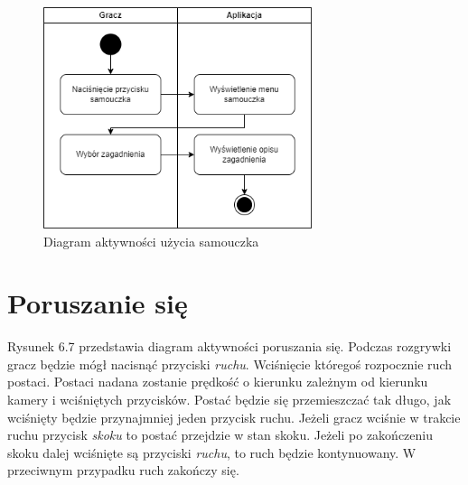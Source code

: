 \begin{figure}[H]
    \centering
        \includegraphics[width=0.7\textwidth]{Graphics/activities/tutorial.png}
         \caption{Diagram aktywności użycia samouczka}
\end{figure}

\clearpage

\section{Poruszanie się}

Rysunek 6.7 przedstawia diagram aktywności poruszania się.
Podczas rozgrywki gracz będzie mógł nacisnąć przyciski \textit{ruchu}. Wciśnięcie któregoś rozpocznie ruch postaci. Postaci nadana zostanie prędkość o kierunku zależnym od kierunku kamery i wciśniętych przycisków. Postać będzie się przemieszczać tak długo, jak wciśnięty będzie przynajmniej jeden przycisk ruchu. Jeżeli gracz wciśnie w trakcie ruchu przycisk \textit{skoku} to postać przejdzie w stan skoku. Jeżeli po zakończeniu skoku dalej wciśnięte są przyciski \textit{ruchu}, to ruch będzie kontynuowany. W przeciwnym przypadku ruch zakończy się.

